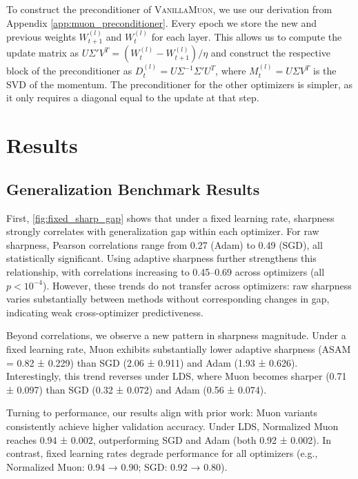 \documentclass{article}
\theoremstyle{plain}
\theoremstyle{definition}
\theoremstyle{remark}
\begin{document}
To construct the preconditioner of \textsc{VanillaMuon}, we use our derivation from Appendix \ref{app:muon_preconditioner}. Every epoch we store the new and previous weights $W_{t+1}^{(l)}$ and $W_t^{(l)}$ for each layer. This allows us to compute the update matrix as $U\Sigma'V^T = (W_t^{(l)} - W_{t+1}^{(l)})/\eta$ and construct the respective block of the preconditioner as $D_t^{(l)} = U \Sigma^{-1} \Sigma' U^T$, where $M_t^{(l)} = U \Sigma V^T$ is the SVD of the momentum. The preconditioner for the other optimizers is simpler, as it only requires a diagonal equal to the update at that step.

\section{Results}

\subsection{Generalization Benchmark Results}

First, \autoref{fig:fixed_sharp_gap} shows that under a fixed learning rate, sharpness strongly correlates with generalization gap within each optimizer. For raw sharpness, Pearson correlations range from 0.27 (Adam) to 0.49 (SGD), all statistically significant. Using adaptive sharpness further strengthens this relationship, with correlations increasing to 0.45–0.69 across optimizers (all $p<10^{-4}$). However, these trends do not transfer across optimizers: raw sharpness varies substantially between methods without corresponding changes in gap, indicating weak cross-optimizer predictiveness.

Beyond correlations, we observe a new pattern in sharpness magnitude. Under a fixed learning rate, Muon exhibits substantially lower adaptive sharpness (ASAM = 0.82 ± 0.229) than SGD (2.06 ± 0.911) and Adam (1.93 ± 0.626). Interestingly, this trend reverses under LDS, where Muon becomes sharper (0.71 ± 0.097) than SGD (0.32 ± 0.072) and Adam (0.56 ± 0.074).

Turning to performance, our results align with prior work: Muon variants consistently achieve higher validation accuracy. Under LDS, Normalized Muon reaches 0.94 ± 0.002, outperforming SGD and Adam (both 0.92 ± 0.002). In contrast, fixed learning rates degrade performance for all optimizers (e.g., Normalized Muon: 0.94 → 0.90; SGD: 0.92 → 0.80).
\end{document}
